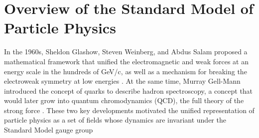 \documentclass[dissertation.tex]{subfiles}
\begin{document}
\chapter{Overview of the Standard Model of Particle Physics}
\label{chap:Overview of the Standard Model of Particle Physics}






In the 1960s, Sheldon Glashow, Steven Weinberg, and Abdus Salam proposed a mathematical framework that unified the electromagnetic and weak forces at an energy scale in the hundreds of GeV/c, as well as a mechanism for breaking the electroweak symmetry at low energies \cite{Glashow_Weinberg_and_Salam}.  At the same time, Murray Gell-Mann introduced the concept of quarks to describe hadron spectroscopy, a concept that would later grow into quantum chromodynamics (QCD), the full theory of the strong force \cite{Gell-Mann}.  These two key developments motivated the unified representation of particle physics as a set of fields whose dynamics are invariant under the Standard Model gauge group
\end{document}
